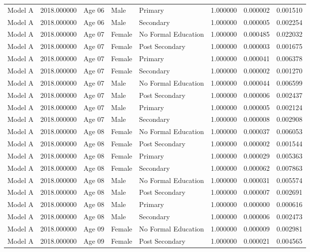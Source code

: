 \begin{table}[ht]
\begin{tabular}{lrlllrrr}
Model A & 2018.000000 & Age 06 & Male & Primary & 1.000000 & 0.000002 & 0.001510 \\
Model A & 2018.000000 & Age 06 & Male & Secondary & 1.000000 & 0.000005 & 0.002254 \\
Model A & 2018.000000 & Age 07 & Female & No Formal Education & 1.000000 & 0.000485 & 0.022032 \\
Model A & 2018.000000 & Age 07 & Female & Post Secondary & 1.000000 & 0.000003 & 0.001675 \\
Model A & 2018.000000 & Age 07 & Female & Primary & 1.000000 & 0.000041 & 0.006378 \\
Model A & 2018.000000 & Age 07 & Female & Secondary & 1.000000 & 0.000002 & 0.001270 \\
Model A & 2018.000000 & Age 07 & Male & No Formal Education & 1.000000 & 0.000044 & 0.006599 \\
Model A & 2018.000000 & Age 07 & Male & Post Secondary & 1.000000 & 0.000006 & 0.002437 \\
Model A & 2018.000000 & Age 07 & Male & Primary & 1.000000 & 0.000005 & 0.002124 \\
Model A & 2018.000000 & Age 07 & Male & Secondary & 1.000000 & 0.000008 & 0.002908 \\
Model A & 2018.000000 & Age 08 & Female & No Formal Education & 1.000000 & 0.000037 & 0.006053 \\
Model A & 2018.000000 & Age 08 & Female & Post Secondary & 1.000000 & 0.000002 & 0.001544 \\
Model A & 2018.000000 & Age 08 & Female & Primary & 1.000000 & 0.000029 & 0.005363 \\
Model A & 2018.000000 & Age 08 & Female & Secondary & 1.000000 & 0.000062 & 0.007863 \\
Model A & 2018.000000 & Age 08 & Male & No Formal Education & 1.000000 & 0.000031 & 0.005574 \\
Model A & 2018.000000 & Age 08 & Male & Post Secondary & 1.000000 & 0.000007 & 0.002691 \\
Model A & 2018.000000 & Age 08 & Male & Primary & 1.000000 & 0.000000 & 0.000616 \\
Model A & 2018.000000 & Age 08 & Male & Secondary & 1.000000 & 0.000006 & 0.002473 \\
Model A & 2018.000000 & Age 09 & Female & No Formal Education & 1.000000 & 0.000009 & 0.002981 \\
Model A & 2018.000000 & Age 09 & Female & Post Secondary & 1.000000 & 0.000021 & 0.004565 \\

\end{tabular}
\end{table}
